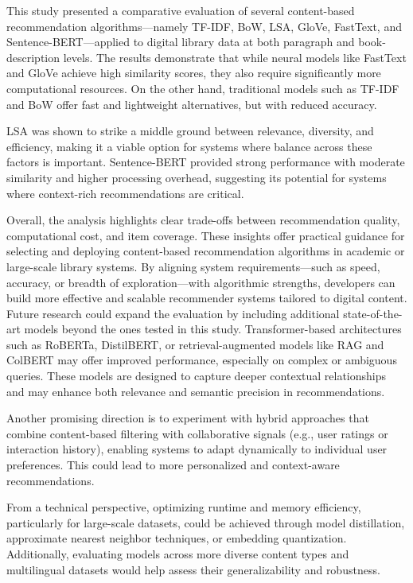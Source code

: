 \documentclass[conference]{IEEEtran}
\begin{document}
This study presented a comparative evaluation of several content-based recommendation algorithms—namely TF-IDF, BoW, LSA, GloVe, FastText, and Sentence-BERT—applied to digital library data at both paragraph and book-description levels. The results demonstrate that while neural models like FastText and GloVe achieve high similarity scores, they also require significantly more computational resources. On the other hand, traditional models such as TF-IDF and BoW offer fast and lightweight alternatives, but with reduced accuracy.

LSA was shown to strike a middle ground between relevance, diversity, and efficiency, making it a viable option for systems where balance across these factors is important. Sentence-BERT provided strong performance with moderate similarity and higher processing overhead, suggesting its potential for systems where context-rich recommendations are critical.

Overall, the analysis highlights clear trade-offs between recommendation quality, computational cost, and item coverage. These insights offer practical guidance for selecting and deploying content-based recommendation algorithms in academic or large-scale library systems. By aligning system requirements—such as speed, accuracy, or breadth of exploration—with algorithmic strengths, developers can build more effective and scalable recommender systems tailored to digital content.\\

Future research could expand the evaluation by including additional state-of-the-art models beyond the ones tested in this study. Transformer-based architectures such as RoBERTa, DistilBERT, or retrieval-augmented models like RAG and ColBERT may offer improved performance, especially on complex or ambiguous queries. These models are designed to capture deeper contextual relationships and may enhance both relevance and semantic precision in recommendations.

Another promising direction is to experiment with hybrid approaches that combine content-based filtering with collaborative signals (e.g., user ratings or interaction history), enabling systems to adapt dynamically to individual user preferences. This could lead to more personalized and context-aware recommendations.

From a technical perspective, optimizing runtime and memory efficiency, particularly for large-scale datasets, could be achieved through model distillation, approximate nearest neighbor techniques, or embedding quantization. Additionally, evaluating models across more diverse content types and multilingual datasets would help assess their generalizability and robustness.



\ifCLASSOPTIONcaptionsoff
  \newpage
\fi

 


\graphicspath{ {./fig/} }
\end{document}
